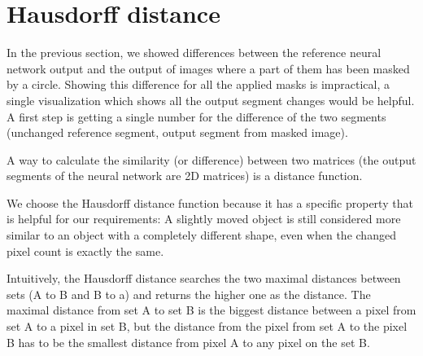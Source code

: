 \section{Hausdorff distance}
\label{hausdorff_distance_chapter}

In the previous section, we showed differences between the reference neural network output and the output of images where a part of them has been masked by a circle.
Showing this difference for all the applied masks is impractical, a single visualization which shows all the output segment changes would be helpful.
A first step is getting a single number for the difference of the two segments (unchanged reference segment, output segment from masked image).

A way to calculate the similarity (or difference) between two matrices (the output segments of the neural network are 2D matrices) is a distance function.

We choose the Hausdorff distance function because it has a specific property that is helpful for our requirements: A slightly moved object is still considered more similar to
an object with a completely different shape, even when the changed pixel count is exactly the same.


Intuitively, the Hausdorff distance searches the two maximal distances between sets (A to B and B to a) and returns the higher one as the distance.
The maximal distance from set A to set B is the biggest distance between a pixel from set A to a pixel in set B, but the distance from the pixel from set A to the pixel B has to be the smallest distance from pixel A to any pixel on the set B.

